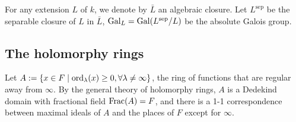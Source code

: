\documentclass{article}
\newcommand{\F}{\mathbb{F}}
\newcommand{\sep}{\mathrm{sep}}
\renewcommand{\O}{\mathcal{O}}
\newcommand{\m}{\mathfrak{m}}
\begin{document}
For any extension $L$ of $k$, we denote by $\bar{L}$ an algebraic closure. Let $L^\sep$ be the separable closure of $L$ in $\bar L$,
$\gal_L = \gal(L^\sep/L)$ be the absolute Galois group.

\subsection{The holomorphy rings}
Let $A := \{x\in F\mid \operatorname{ord}_\lambda(x)\ge 0, \forall \lambda\ne \infty\}$, the ring of functions that are regular away from $\infty$.
By the general theory of holomorphy rings, $A$ is a Dedekind domain with fractional field $\operatorname{Frac}(A) = F$, and there is a 1-1 correspondence between maximal ideals of $A$ and the places of $F$ except for $\infty$.

\end{document}
